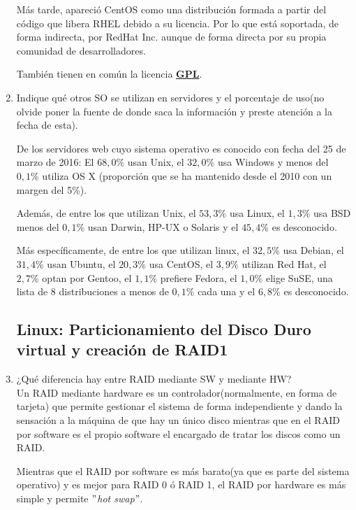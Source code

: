 \documentclass[paper=a4, fontsize=11pt]{scrartcl} %
\numberwithin{equation}{section} %
\numberwithin{figure}{section} %
\numberwithin{table}{section} %
\begin{document}
\begin{enumerate}
		Más tarde, apareció CentOS como una distribución formada a partir del código que libera
		RHEL debido a su licencia. Por lo que está soportada, de forma indirecta, por RedHat Inc.
		aunque de forma directa por su propia comunidad de desarrolladores.
		
		También tienen en común la licencia \href{https://www.gnu.org/licenses/gpl.html}{\textbf{GPL}}.
		
		\item Indique qué otros SO se utilizan en servidores y el porcentaje de uso(no olvide poner
		la fuente de donde saca la información y preste atención a la fecha de esta).
		
		De los servidores web cuyo sistema operativo es conocido con fecha del 25 de marzo de 2016:
		\newline El $68,0\%$ usan Unix, el $32,0\%$ usa Windows y menos del $0,1\%$ utiliza OS X
		\cite{Market_Share_global} (proporción que se ha mantenido desde el 2010 con un margen del 5\%).
		\cite{Market_Share_yearly}
		
		Además, de entre los que utilizan Unix, el $53,3\%$ usa Linux, el $1,3\%$ usa BSD menos del
		$0,1\%$ usan Darwin, HP-UX o Solaris y el $45,4\%$ es desconocido.\cite{Market_Share_unix}
		
		Más específicamente, de entre los que utilizan linux, el $32,5\%$ usa Debian, el $31,4\%$
		usan Ubuntu, el $20,3\%$ usa CentOS, el $3,9\%$ utilizan Red Hat, el $2,7\%$ optan por Gentoo,
		el $1,1\%$ prefiere Fedora, el $1,0\%$ elige SuSE, una lista de 8 distribuciones a menos de
		$0,1\%$ cada una y el $6,8\%$ es desconocido.\cite{Market_Share_linux}
		
	\subsection{Linux: Particionamiento del Disco Duro virtual y creación de RAID1}
		\item ¿Qué diferencia hay entre RAID mediante SW y mediante HW?\\
		Un RAID mediante hardware es un controlador(normalmente, en forma de tarjeta) que permite gestionar
		el sistema de forma independiente y dando la sensación a la máquina de que hay un único disco mientras
		que en el RAID por software es el propio software el encargado de tratar los discos como un RAID.
		
		Mientras que el RAID por software es más barato(ya que es parte del sistema operativo) y es mejor
		para RAID 0 ó RAID 1, el RAID por hardware es más simple y permite \textit{$"$hot swap$"$}.
		\cite{HWvsSW}\cite{RAID_RedHat}
		

\end{enumerate}
\end{document}
